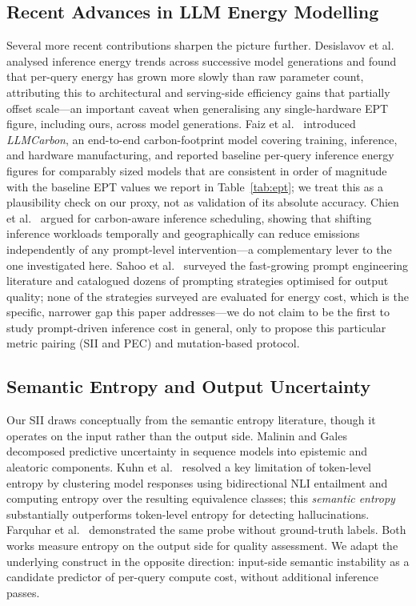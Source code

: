 \documentclass[conference]{IEEEtran}
\begin{document}
\subsection{Recent Advances in LLM Energy Modelling}
Several more recent contributions sharpen the picture further. Desislavov
et al.~\cite{desislavov2023trends} analysed inference energy trends
across successive model generations and found that per-query energy
has grown more slowly than raw parameter count, attributing this to
architectural and serving-side efficiency gains that partially offset
scale---an important caveat when generalising any single-hardware EPT
figure, including ours, across model generations. Faiz et
al.~\cite{faiz2024llmcarbon} introduced \emph{LLMCarbon}, an
end-to-end carbon-footprint model covering training, inference, and
hardware manufacturing, and reported baseline per-query inference
energy figures for comparably sized models that are consistent in
order of magnitude with the baseline EPT values we report in
Table~\ref{tab:ept}; we treat this as a plausibility check on our
proxy, not as validation of its absolute accuracy. Chien et
al.~\cite{chien2023reducing} argued for carbon-aware inference
scheduling, showing that shifting inference workloads temporally and
geographically can reduce emissions independently of any prompt-level
intervention---a complementary lever to the one investigated here.
Sahoo et al.~\cite{sahoo2024systematic} surveyed the fast-growing
prompt engineering literature and catalogued dozens of prompting
strategies optimised for output quality; none of the strategies
surveyed are evaluated for energy cost, which is the specific,
narrower gap this paper addresses---we do not claim to be the first
to study prompt-driven inference cost in general, only to propose this
particular metric pairing (SII and PEC) and mutation-based protocol.
\subsection{Semantic Entropy and Output Uncertainty}
Our SII draws conceptually from the semantic entropy literature,
though it operates on the input rather than the output side. Malinin
and Gales~\cite{malinin2021uncertainty} decomposed predictive
uncertainty in sequence models into epistemic and aleatoric
components. Kuhn et al.~\cite{kuhn2023semantic} resolved a key
limitation of token-level entropy by clustering model responses using
bidirectional NLI entailment and computing entropy over the resulting
equivalence classes; this \emph{semantic entropy} substantially
outperforms token-level entropy for detecting hallucinations. Farquhar
et al.~\cite{farquhar2024detecting} demonstrated the same probe
without ground-truth labels. Both works measure entropy on the output
side for quality assessment. We adapt the underlying construct in the
opposite direction: input-side semantic instability as a candidate
predictor of per-query compute cost, without additional inference
passes.
\end{document}
